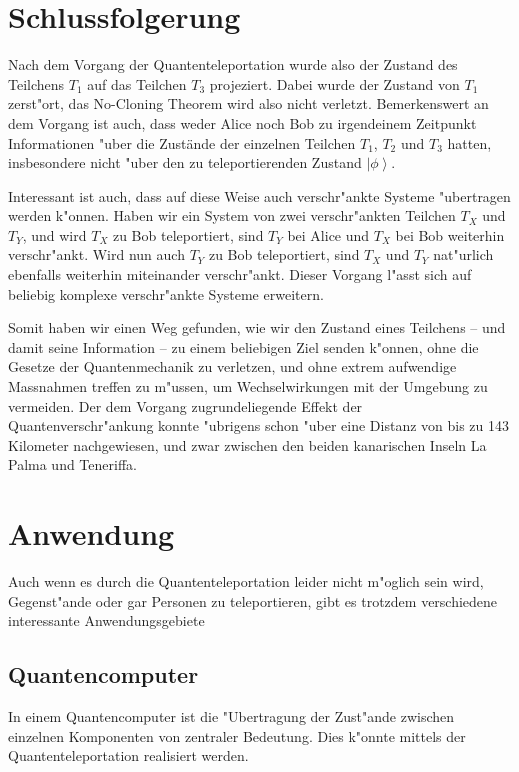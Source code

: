 \begin{refsection}
\section{Schlussfolgerung}

Nach dem Vorgang der Quantenteleportation wurde also der Zustand des Teilchens $T_{1}$ auf das Teilchen $T_{3}$ projeziert. Dabei wurde der Zustand von $T_{1}$ zerst"ort, das No-Cloning Theorem wird also nicht verletzt. Bemerkenswert an dem Vorgang ist auch, dass weder Alice noch Bob zu irgendeinem Zeitpunkt Informationen "uber die Zustände der einzelnen Teilchen $T_{1}$, $T_{2}$ und $T_{3}$ hatten, insbesondere nicht "uber den zu teleportierenden Zustand $\left|\phi\right\rangle$. 

Interessant ist auch, dass auf diese Weise auch verschr"ankte Systeme "ubertragen werden k"onnen. Haben wir ein System von zwei verschr"ankten Teilchen $T_{X}$ und $T_{Y}$, und wird $T_{X}$ zu Bob teleportiert, sind $T_{Y}$ bei Alice und $T_{X}$ bei Bob weiterhin verschr"ankt. Wird nun auch $T_{Y}$ zu Bob teleportiert, sind $T_{X}$ und $T_{Y}$ nat"urlich ebenfalls weiterhin miteinander verschr"ankt. Dieser Vorgang l"asst sich auf beliebig komplexe verschr"ankte Systeme erweitern. 

Somit haben wir einen Weg gefunden, wie wir den Zustand eines Teilchens -- und damit seine Information -- zu einem beliebigen Ziel senden k"onnen, ohne die Gesetze der Quantenmechanik zu verletzen, und ohne extrem aufwendige Massnahmen treffen zu m"ussen, um Wechselwirkungen mit der Umgebung zu vermeiden. Der dem Vorgang zugrundeliegende Effekt der Quantenverschr"ankung konnte "ubrigens schon "uber eine Distanz von bis zu 143 Kilometer nachgewiesen, und zwar zwischen den beiden kanarischen Inseln La Palma und Teneriffa.
\section{Anwendung}

Auch wenn es durch die Quantenteleportation leider nicht m"oglich sein wird, Gegenst"ande oder gar Personen zu teleportieren, gibt es trotzdem verschiedene interessante Anwendungsgebiete

\subsection{Quantencomputer}

In einem Quantencomputer ist die "Ubertragung der Zust"ande zwischen einzelnen Komponenten von zentraler Bedeutung. Dies k"onnte mittels der Quantenteleportation realisiert werden.


\end{refsection}
